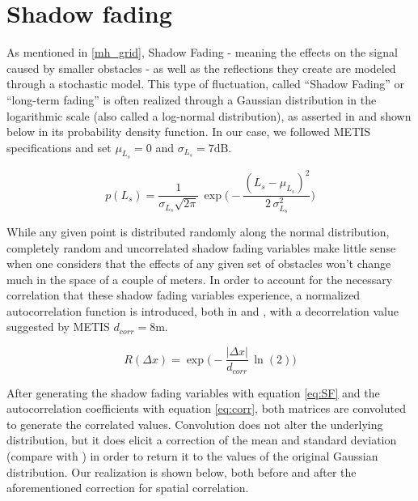 \section{Shadow fading} \label{SF}
As mentioned in \ref{mh_grid}, Shadow Fading - meaning the effects on the signal caused by smaller obstacles - as well as the reflections they create are modeled through a stochastic model. This type of fluctuation, called ``Shadow Fading'' or ``long-term fading'' is often realized through a Gaussian distribution in the logarithmic scale (also called a log-normal distribution), as asserted in \cite{Forkel2004} and shown below in its probability density function. In our case, we followed METIS specifications and set $\mu_{L_s} = 0$ and $\sigma_{L_s} = 7 \text{dB}$.

\begin{equation} \label{eq:SF}
p(L_s) = \frac{1}{{\sigma_{L_s} \sqrt {2\pi } }}\,\exp\bigg(-\frac{(L_s - \mu_{L_s})^2}{2\,\sigma_{L_s}^2}\bigg)
\end{equation}

While any given point is distributed randomly along the normal distribution, completely random and uncorrelated shadow fading variables make little sense when one considers that the effects of any given set of obstacles won't change much in the space of a couple of meters. In order to account for the necessary correlation that these shadow fading variables experience, a normalized autocorrelation function is introduced, both in \cite{Forkel2004} and \cite{Raschkowski}, with a decorrelation value suggested by METIS $d_{corr} = 8 \text{m}$.

\begin{equation} \label{eq:corr}
R(\Delta x) = \exp\bigg(-\frac{|\Delta x|}{d_{corr}}\,\ln(2)\bigg)
\end{equation}

After generating the shadow fading variables with equation \ref{eq:SF} and the autocorrelation coefficients with equation \ref{eq:corr}, both matrices are convoluted to generate the correlated values. Convolution does not alter the underlying distribution, but it does elicit a correction of the mean and standard deviation (compare with \cite{Forkel2004}) in order to return it to the values of the original Gaussian distribution. Our realization is shown below, both before and after the aforementioned correction for spatial correlation.


